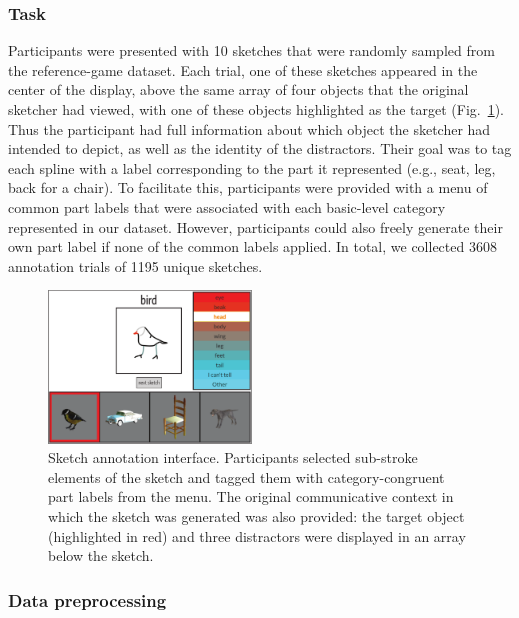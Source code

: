 \documentclass[10pt,letterpaper]{article}
\begin{document}
\subsubsection{Task}
Participants were presented with 10 sketches that were randomly sampled from the reference-game dataset. 
Each trial, one of these sketches appeared in the center of the display, above the same array of four objects that the original sketcher had viewed, with one of these objects highlighted as the target (Fig.~\ref{annotation_interface}). 
Thus the participant had full information about which object the sketcher had intended to depict, as well as the identity of the distractors. 
Their goal was to tag each spline with a label corresponding to the part it represented (e.g., seat, leg, back for a chair). 
To facilitate this, participants were provided with a menu of common part labels that were associated with each basic-level category represented in our dataset. 
However, participants could also freely generate their own part label if none of the common labels applied.
In total, we collected 3608 annotation trials of 1195 unique sketches.

\begin{figure}[htbp]
\centering
\includegraphics[width=0.48\textwidth]{figures/1_annotation_interface.pdf}
\caption{Sketch annotation interface. Participants selected sub-stroke elements of the sketch and tagged them with category-congruent part labels from the menu. The original communicative context in which the sketch was generated was also provided: the target object (highlighted in red) and three distractors were displayed in an array below the sketch.}
\label{annotation_interface}
\end{figure}


\subsubsection{Data preprocessing}
\end{document}

